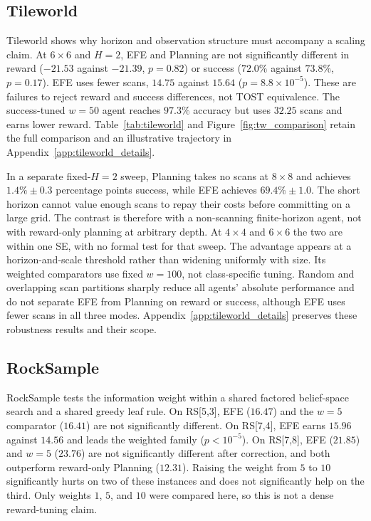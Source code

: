 \subsection{Tileworld}
\label{sec:tileworld}

Tileworld shows why horizon and observation structure must accompany a scaling claim. At $6{\times}6$ and $H{=}2$, EFE and Planning are not significantly different in reward ($-21.53$ against $-21.39$, $p=0.82$) or success ($72.0\%$ against $73.8\%$, $p=0.17$). EFE uses fewer scans, $14.75$ against $15.64$ ($p=8.8{\times}10^{-5}$). These are failures to reject reward and success differences, not TOST equivalence. The success-tuned $w{=}50$ agent reaches $97.3\%$ accuracy but uses $32.25$ scans and earns lower reward. Table~\ref{tab:tileworld} and Figure~\ref{fig:tw_comparison} retain the full comparison and an illustrative trajectory in Appendix~\ref{app:tileworld_details}.

In a separate fixed-$H{=}2$ sweep, Planning takes no scans at $8{\times}8$ and achieves $1.4\%\pm0.3$ percentage points success, while EFE achieves $69.4\%\pm1.0$. The short horizon cannot value enough scans to repay their costs before committing on a large grid. The contrast is therefore with a non-scanning finite-horizon agent, not with reward-only planning at arbitrary depth. At $4{\times}4$ and $6{\times}6$ the two are within one SE, with no formal test for that sweep. The advantage appears at a horizon-and-scale threshold rather than widening uniformly with size. Its weighted comparators use fixed $w{=}100$, not class-specific tuning. Random and overlapping scan partitions sharply reduce all agents' absolute performance and do not separate EFE from Planning on reward or success, although EFE uses fewer scans in all three modes. Appendix~\ref{app:tileworld_details} preserves these robustness results and their scope.

\subsection{RockSample}
\label{sec:rocksample}

RockSample tests the information weight within a shared factored belief-space search and a shared greedy leaf rule. On RS[5,3], EFE ($16.47$) and the $w{=}5$ comparator ($16.41$) are not significantly different. On RS[7,4], EFE earns $15.96$ against $14.56$ and leads the weighted family ($p<10^{-5}$). On RS[7,8], EFE ($21.85$) and $w{=}5$ ($23.76$) are not significantly different after correction, and both outperform reward-only Planning ($12.31$). Raising the weight from $5$ to $10$ significantly hurts on two of these instances and does not significantly help on the third. Only weights $1$, $5$, and $10$ were compared here, so this is not a dense reward-tuning claim.

